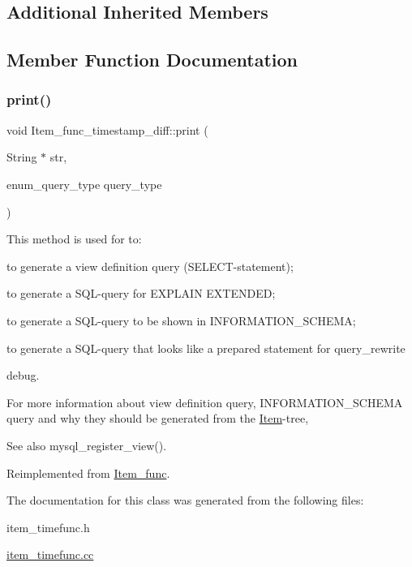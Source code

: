 \subsection*{Additional Inherited Members}


\subsection{Member Function Documentation}
\mbox{\label{classItem__func__timestamp__diff_ad6f3cff0c7490aaabba3e11f18de66ec}} 
\subsubsection{\texorpdfstring{print()}{print()}}
{\footnotesize\ttfamily void Item\+\_\+func\+\_\+timestamp\+\_\+diff\+::print (\begin{DoxyParamCaption}\item[{String $\ast$}]{str,  }\item[{enum\+\_\+query\+\_\+type}]{query\+\_\+type }\end{DoxyParamCaption})\hspace{0.3cm}{\ttfamily [virtual]}}

This method is used for to\+:
\begin{DoxyItemize}
\item to generate a view definition query (S\+E\+L\+E\+CT-\/statement);
\item to generate a S\+QL-\/query for E\+X\+P\+L\+A\+IN E\+X\+T\+E\+N\+D\+ED;
\item to generate a S\+QL-\/query to be shown in I\+N\+F\+O\+R\+M\+A\+T\+I\+O\+N\+\_\+\+S\+C\+H\+E\+MA;
\item to generate a S\+QL-\/query that looks like a prepared statement for query\+\_\+rewrite
\item debug.
\end{DoxyItemize}

For more information about view definition query, I\+N\+F\+O\+R\+M\+A\+T\+I\+O\+N\+\_\+\+S\+C\+H\+E\+MA query and why they should be generated from the \mbox{\hyperlink{classItem}{Item}}-\/tree, \begin{DoxySeeAlso}{See also}
mysql\+\_\+register\+\_\+view(). 
\end{DoxySeeAlso}


Reimplemented from \mbox{\hyperlink{classItem__func_afb302ee25d4721ace27d3f5053d4ee41}{Item\+\_\+func}}.



The documentation for this class was generated from the following files\+:\begin{DoxyCompactItemize}
\item 
item\+\_\+timefunc.\+h\item 
\mbox{\hyperlink{item__timefunc_8cc}{item\+\_\+timefunc.\+cc}}\end{DoxyCompactItemize}
